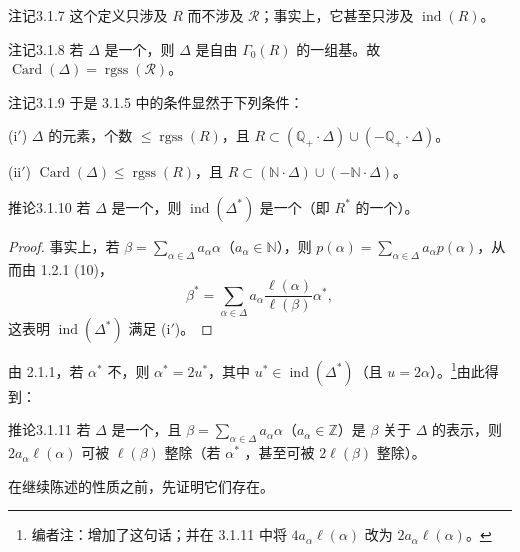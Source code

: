 \begin{SGAresult}{注记}{3.1.7}
这个定义只涉及 $R$ 而不涉及 $\mathscr R$；事实上，它甚至只涉及 $\operatorname{ind}(R)$。
\end{SGAresult}
\begin{SGAresult}{注记}{3.1.8}
若 $\Delta$ 是一个，则 $\Delta$ 是自由 $\Gamma_0(R)$ 的一组基。故 $\operatorname{Card}(\Delta)=\operatorname{rgss}(\mathscr R)$。
\end{SGAresult}
\begin{SGAresult}{注记}{3.1.9}
于是 3.1.5 中的条件显然于下列条件：

(i$'$) $\Delta$ 的元素，个数 $\leq\operatorname{rgss}(R)$，且 $R\subset(\mathbb Q_+\cdot\Delta)\cup(-\mathbb Q_+\cdot\Delta)$。

(ii$'$) $\operatorname{Card}(\Delta)\leq\operatorname{rgss}(R)$，且 $R\subset(\mathbb N\cdot\Delta)\cup(-\mathbb N\cdot\Delta)$。
\end{SGAresult}
\begin{SGAresult}{推论}{3.1.10}
若 $\Delta$ 是一个，则 $\operatorname{ind}(\Delta^*)$ 是一个（即 $R^*$ 的一个）。
\end{SGAresult}
\begin{proof}
事实上，若 $\beta=\sum_{\alpha\in\Delta}a_\alpha\alpha$（$a_\alpha\in\mathbb N$），则 $p(\alpha)=\sum_{\alpha\in\Delta}a_\alpha p(\alpha)$，从而由 1.2.1 (10)，
\[\beta^*=\sum_{\alpha\in\Delta}a_\alpha\frac{\ell(\alpha)}{\ell(\beta)}\alpha^*,\]
这表明 $\operatorname{ind}(\Delta^*)$ 满足 (i$'$)。
\end{proof}
由 2.1.1，若 $\alpha^*$ 不，则 $\alpha^*=2u^*$，其中 $u^*\in\operatorname{ind}(\Delta^*)$（且 $u=2\alpha$）。\footnote{编者注：增加了这句话；并在 3.1.11 中将 $4a_\alpha\ell(\alpha)$ 改为 $2a_\alpha\ell(\alpha)$。}由此得到：
\begin{SGAresult}{推论}{3.1.11}
若 $\Delta$ 是一个，且 $\beta=\sum_{\alpha\in\Delta}a_\alpha\alpha$（$a_\alpha\in\mathbb Z$）是 $\beta$ 关于 $\Delta$ 的表示，则 $2a_\alpha\ell(\alpha)$ 可被 $\ell(\beta)$ 整除（若 $\alpha^*$ ，甚至可被 $2\ell(\beta)$ 整除）。
\end{SGAresult}
在继续陈述的性质之前，先证明它们存在。

